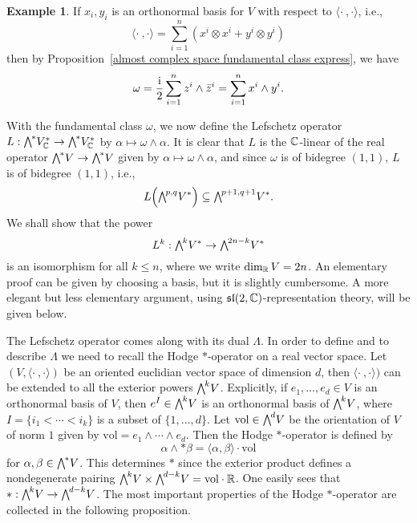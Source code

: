 \documentclass[11pt]{book}
\theoremstyle{definition}
\newtheorem{example}[theorem]{Example}
\begin{document}
\begin{example}
If $x_i,y_i$ is an orthonormal basis for $V$ with respect to $\langle\cdot\ ,\cdot\rangle$, i.e.,
\[\langle\cdot\ ,\cdot\rangle=\sum_{i=1}^{n}(x^i\otimes x^i+y^i\otimes y^i)\]
then by Proposition~\ref{almost complex space fundamental class express}, we have
\[\omega=\frac{\mathrm{i}}{2}\sum_{i=1}^{n}z^i\wedge\bar{z}^i=\sum_{i=1}^{n}x^i\wedge y^i.\]
\end{example}
With the fundamental class $\omega$, we now define the Lefschetz operator $L:\bigw^*V^*_{\C}\to\bigw^*V^*_{\C}$ by $\alpha\mapsto\omega\wedge\alpha$. It is clear that $L$ is the $\mathbb{C}$-linear of the real operator $\bigw^*V\to\bigw^*V$ given by $\alpha\mapsto\omega\wedge\alpha$, and since $\omega$ is of bidegree $(1,1)$, $L$ is of bidegree $(1,1)$, i.e.,
\[L\Big(\bigw^{p,q}V^*\Big)\sub\bigw^{p+1,q+1}V^*.\]
We shall show that the power
\[L^k:\bigw^kV^*\to\bigw^{2n-k}V^*\]
is an isomorphism for all $k\leq n$, where we write $\dim_{\mathbb{R}}V=2n$. An elementary proof can be given by choosing a basis, but it is slightly cumbersome. A more elegant but less elementary argument, using $\mathfrak{sl}(2,\mathbb{C})$-representation theory, will be given below.\par
The Lefschetz operator comes along with its dual $\Lambda$. In order to define and to describe $\Lambda$ we need to recall the Hodge $\ast$-operator on a real vector space. Let $(V,\langle\cdot\ ,\cdot\rangle)$ be an oriented euclidian vector space of dimension $d$, then $\langle\cdot\ ,\cdot\rangle)$ can be extended to all the exterior powers $\bigw^kV$. Explicitly, if $e_1,\dots,e_d\in V$ is an orthonormal basis of $V$, then $e^I\in\bigw^kV$ is an orthonormal basis of $\bigw^kV$, where $I=\{i_1<\cdots<i_k\}$ is a subset of $\{1,\dots,d\}$. Let $\mathrm{vol}\in\bigw^dV$ be the orientation of $V$ of norm $1$ given by $\mathrm{vol}=e_1\wedge\cdots\wedge e_d$. Then the Hodge $\ast$-operator is defined by
\[\alpha\wedge\ast\beta=\langle\alpha,\beta\rangle\cdot\mathrm{vol}\]
for $\alpha,\beta\in\bigw^*V$. This determines $\ast$ since the exterior product defines a nondegenerate pairing $\bigw^kV\times\bigw^{d-k}V=\mathrm{vol}\cdot\R$. One easily sees that $\ast:\bigw^kV\to\bigw^{d-k}V$. The most important properties of the Hodge $\ast$-operator are collected in the following proposition.
\end{document}
